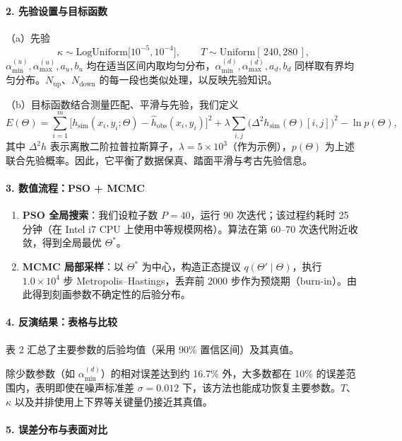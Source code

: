 \documentclass[11pt,a4paper,fontset=windows]{ctexart}
\begin{document}
\paragraph*{2. 先验设置与目标函数}
\noindent（a）先验
\[
\kappa\sim\text{LogUniform}\bigl[10^{-5},10^{-4}\bigr],\qquad
T\sim\text{Uniform}[\,240,280\,],
\]
$\alpha_{\min}^{(u)},\alpha_{\max}^{(u)},a_u,b_u$ 均在适当区间内取均匀分布，$\alpha_{\min}^{(d)},\alpha_{\max}^{(d)},a_d,b_d$ 同样取有界均匀分布。$N_{\text{up}}$、$N_{\text{down}}$ 的每一段也类似处理，以反映先验知识。

\noindent（b）目标函数\quad 结合测量匹配、平滑与先验，我们定义
\[
E(\Theta)=\sum_{i=1}^{m}\bigl[h_{\text{sim}}(x_i,y_i;\Theta)-\hat{h}_{\text{obs}}(x_i,y_i)\bigr]^2
+\lambda\sum_{i,j}\bigl(\Delta^2h_{\text{sim}}(\Theta)[i,j]\bigr)^2-\ln p(\Theta),
\]
其中 $\Delta^2h$ 表示离散二阶拉普拉斯算子，$\lambda=5\times10^{3}$（作为示例），$p(\Theta)$ 为上述联合先验概率。因此，它平衡了数据保真、踏面平滑与考古先验信息。

\paragraph*{3. 数值流程：PSO + MCMC}
\begin{enumerate}
\item \textbf{PSO 全局搜索}：我们设粒子数 $P=40$，运行 90 次迭代；该过程约耗时 25 分钟（在 Intel i7 CPU 上使用中等规模网格）。算法在第 60--70 次迭代附近收敛，得到全局最优 $\Theta^{*}$。
\item \textbf{MCMC 局部采样}：以 $\Theta^{*}$ 为中心，构造正态提议 $q(\Theta'\mid\Theta)$，执行 $1.0\times10^{4}$ 步 Metropolis--Hastings，丢弃前 2000 步作为预烧期（burn-in）。由此得到刻画参数不确定性的后验分布。
\end{enumerate}

\paragraph*{4. 反演结果：表格与比较}

表 2 汇总了主要参数的后验均值（采用 90\% 置信区间）及其真值。

除少数参数（如 $\alpha_{\min}^{(d)}$）的相对误差达到约 16.7\% 外，大多数都在 10\% 的误差范围内，表明即使在噪声标准差 $\sigma=0.012$ 下，该方法也能成功恢复主要参数。$T$、$\kappa$ 以及并排使用上下界等关键量仍接近其真值。

\paragraph*{5. 误差分布与表面对比}
\end{document}
